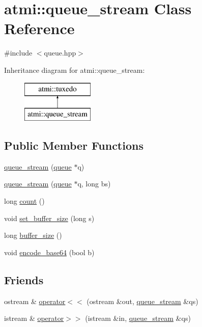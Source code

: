 \hypertarget{classatmi_1_1queue__stream}{\section{atmi\+:\+:queue\+\_\+stream Class Reference}
\label{classatmi_1_1queue__stream}
}


{\ttfamily \#include $<$queue.\+hpp$>$}

Inheritance diagram for atmi\+:\+:queue\+\_\+stream\+:\begin{figure}[H]
\begin{center}
\leavevmode
\includegraphics[height=2.000000cm]{classatmi_1_1queue__stream}
\end{center}
\end{figure}
\subsection*{Public Member Functions}
\begin{DoxyCompactItemize}
\item 
\hyperlink{classatmi_1_1queue__stream_a775623d6cd91a8a3cd40d9bb1e492c60}{queue\+\_\+stream} (\hyperlink{classatmi_1_1queue}{queue} $\ast$q)
\item 
\hyperlink{classatmi_1_1queue__stream_af05f48449db9ed2282643d9e7c148944}{queue\+\_\+stream} (\hyperlink{classatmi_1_1queue}{queue} $\ast$q, long bs)
\item 
long \hyperlink{classatmi_1_1queue__stream_ac4f1e88530a4d9fda0bc4b271301866b}{count} ()
\item 
void \hyperlink{classatmi_1_1queue__stream_a500b658e3f3f1a353982a1304ea27801}{set\+\_\+buffer\+\_\+size} (long s)
\item 
long \hyperlink{classatmi_1_1queue__stream_a18d01411c5ffeffd190195fd2b4dc61a}{buffer\+\_\+size} ()
\item 
void \hyperlink{classatmi_1_1queue__stream_a4a47e7caf329e46c31f44425e3ceb6e3}{encode\+\_\+base64} (bool b)
\end{DoxyCompactItemize}
\subsection*{Friends}
\begin{DoxyCompactItemize}
\item 
ostream \& \hyperlink{classatmi_1_1queue__stream_ad655c66351739698af3d404de31d3179}{operator$<$$<$} (ostream \&out, \hyperlink{classatmi_1_1queue__stream}{queue\+\_\+stream} \&qs)
\item 
istream \& \hyperlink{classatmi_1_1queue__stream_a52e264f6a625c0a453157abc46da7efe}{operator$>$$>$} (istream \&in, \hyperlink{classatmi_1_1queue__stream}{queue\+\_\+stream} \&qs)
\end{DoxyCompactItemize}
